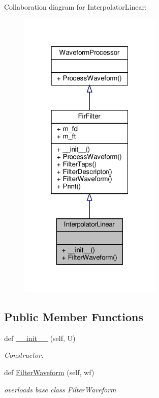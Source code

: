 Collaboration diagram for Interpolator\+Linear\+:\nopagebreak
\begin{figure}[H]
\begin{center}
\leavevmode
\includegraphics[width=193pt]{classSignalIntegrity_1_1TimeDomain_1_1Filters_1_1InterpolatorLinear_1_1InterpolatorLinear__coll__graph}
\end{center}
\end{figure}
\subsection*{Public Member Functions}
\begin{DoxyCompactItemize}
\item 
def \hyperlink{classSignalIntegrity_1_1TimeDomain_1_1Filters_1_1InterpolatorLinear_1_1InterpolatorLinear_abff7619574bd23d3249b999fcc5bc87b}{\+\_\+\+\_\+init\+\_\+\+\_\+} (self, U)
\begin{DoxyCompactList}\small\item\em Constructor. \end{DoxyCompactList}\item 
def \hyperlink{classSignalIntegrity_1_1TimeDomain_1_1Filters_1_1InterpolatorLinear_1_1InterpolatorLinear_a84e73c18250ca4a61482f94ad61e735b}{Filter\+Waveform} (self, wf)
\begin{DoxyCompactList}\small\item\em overloads base class Filter\+Waveform \end{DoxyCompactList}\end{DoxyCompactItemize}


